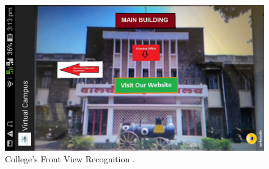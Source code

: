 \documentclass{article}
\begin{document}
\begin{figure}[h]
	\includegraphics[scale=0.2,angle=90]{MainBuilding.jpg}
	\caption{College's Front View Recognition . }
\end{figure}
\fi
\end{document}
